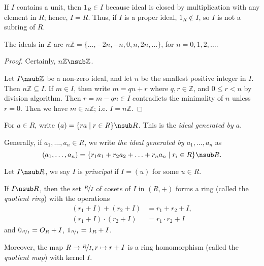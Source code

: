 \begin{remark}
    If \(I\) contains a unit, then \(1_R \in I\) because ideal is closed by multiplication with any element in \(R\); hence, \(I=R\). Thus, if \(I\) is a proper ideal, \(1_R \notin I\), so \(I\) is not a subring of \(R\).
\end{remark}
\begin{lemma}{}{}
    The ideals in \(\mathbb{Z}\) are \(n\mathbb{Z} = \{\ldots,-2n, -n, 0, n, 2n, \ldots\}\), for \(n = 0, 1, 2, \ldots\).
\end{lemma}
\begin{proof}
    Certainly, \(n\mathbb{Z} \nsub \mathbb{Z}\).

    Let \(I \nsub \mathbb{Z}\) be a non-zero ideal, and let \(n\) be the smallest positive integer in \(I\). Then \(n\mathbb{Z} \subseteq I\). If \(m \in I\), then write \(m = qn + r\) where \(q, r\in \mathbb{Z}\), and \(0\leq r < n\) by division algorithm. Then \(r = m - qn \in I\) contradicts the minimality of \(n\) unless \(r = 0\). Then we have \(m \in n\mathbb{Z}\); i.e. \(I = n\mathbb{Z}\).
\end{proof}
\begin{definition}{}{}
    For \(a \in R\), write \((a) = \{ra\mid r\in R\} \nsub R\). This is the \textit{ideal generated by \(a\)}.

    Generally, if \(a_1, \ldots, a_n \in R\), we write \textit{the ideal generated by \(a_1, \ldots, a_n\)} as
    \[
        (a_1, \ldots, a_n) = \{r_{1}a_1 + r_2 a_2 + \ldots + r_n a_n \mid r_i \in R\} \nsub R.
    \]
\end{definition}
\begin{definition}{}{}
    Let \(I \nsub R\), we say \(I\) is \textit{principal} if \(I = (u)\) for some \(u \in R\).
\end{definition}
\begin{theorem}{}{}
    If \(I \nsub R\), then the set \(\nicefrac{R}{I}\) of cosets of \(I\) in \((R, +)\) forms a ring (called the \textit{quotient ring}) with the operations
    \begin{align*}
        (r_1 + I) + (r_2 + I) &= r_1 + r_2 + I,\\
        (r_1 + I) \cdot (r_2 + I) &= r_1 \cdot r_2 + I
    \end{align*}
    and \(0_{\nicefrac{R}{I}} = O_R + I\), \(1_{\nicefrac{R}{I}} = 1_R + I\).

    Moreover, the map \(R \to \nicefrac{R}{I}, r \mapsto r + I\) is a ring homomorphism (called the \textit{quotient map}) with kernel \(I\).
\end{theorem}
